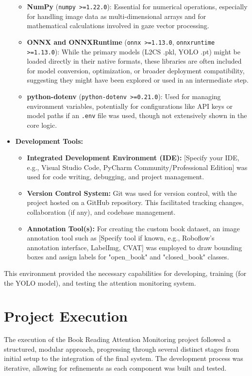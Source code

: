 \begin{itemize}
\begin{itemize}
        \item \textbf{NumPy} (\texttt{numpy >=1.22.0}): Essential for numerical operations, especially for handling image data as multi-dimensional arrays and for mathematical calculations involved in gaze vector processing.
        \item \textbf{ONNX and ONNXRuntime} (\texttt{onnx >=1.13.0}, \texttt{onnxruntime >=1.13.0}): While the primary models (L2CS .pkl, YOLO .pt) might be loaded directly in their native formats, these libraries are often included for model conversion, optimization, or broader deployment compatibility, suggesting they might have been explored or used in an intermediate step.
        \item \textbf{python-dotenv} (\texttt{python-dotenv >=0.21.0}): Used for managing environment variables, potentially for configurations like API keys or model paths if an \texttt{.env} file was used, though not extensively shown in the core logic.
    \end{itemize}
    \item \textbf{Development Tools:}
    \begin{itemize}
        \item \textbf{Integrated Development Environment (IDE):} [Specify your IDE, e.g., Visual Studio Code, PyCharm Community/Professional Edition] was used for code writing, debugging, and project management.
        \item \textbf{Version Control System:} Git was used for version control, with the project hosted on a GitHub repository. This facilitated tracking changes, collaboration (if any), and codebase management.
        \item \textbf{Annotation Tool(s):} For creating the custom book dataset, an image annotation tool such as [Specify tool if known, e.g., Roboflow's annotation interface, LabelImg, CVAT] was employed to draw bounding boxes and assign labels for "open\_book" and "closed\_book" classes.
    \end{itemize}
\end{itemize}
This environment provided the necessary capabilities for developing, training (for the YOLO model), and testing the attention monitoring system.

\section{Project Execution}
The execution of the Book Reading Attention Monitoring project followed a structured, modular approach, progressing through several distinct stages from initial setup to the integration of the final system. The development process was iterative, allowing for refinements as each component was built and tested.

